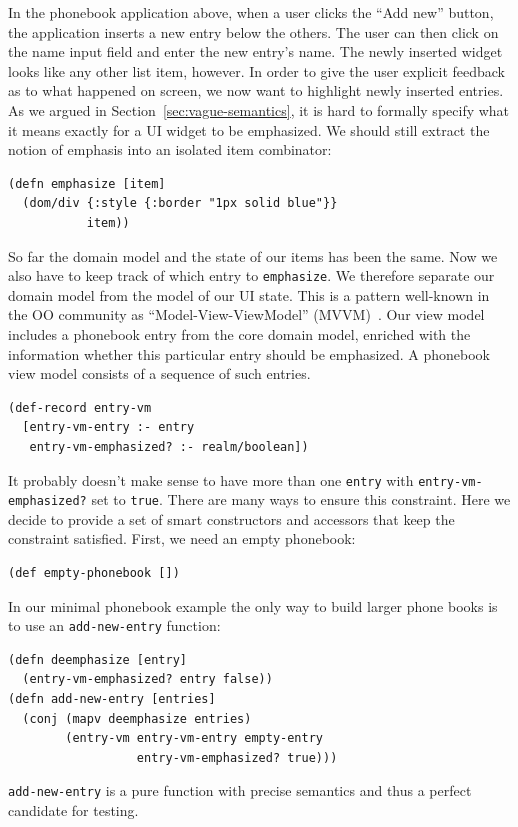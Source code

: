 \documentclass[sigplan,screen]{acmart}
\begin{document}
In the phonebook application above, when a user clicks the ``Add
new'' button, the application inserts a new entry below the others. The user can
then click on the name input field and enter the new entry's name. The
newly inserted widget looks like any other list item, however. In
order to give the user explicit feedback as to what happened on
screen, we now want to highlight newly inserted entries. As we argued
in Section~\ref{sec:vague-semantics}, it is hard to formally specify what it means exactly for a UI
widget to be emphasized. We should still extract the notion of
emphasis into an isolated item combinator:
%
\begin{verbatim}
(defn emphasize [item]
  (dom/div {:style {:border "1px solid blue"}}
           item))
\end{verbatim}
%
So far the domain model and the state of our items has been the same. Now
we also have to keep track of which entry to \texttt{emphasize}. We
therefore separate our domain model from the model of our UI state. This
is a pattern well-known in the OO community
as ``Model-View-ViewModel'' (MVVM)~\cite{MVVM}.
Our view model includes a phonebook entry from the core domain model,
enriched with the information whether this particular entry should be
emphasized. A phonebook view model consists of a sequence of such
entries.
%
\begin{verbatim}
(def-record entry-vm
  [entry-vm-entry :- entry
   entry-vm-emphasized? :- realm/boolean])
\end{verbatim}
%
It probably doesn't make sense to have more than one \texttt{entry} with
\texttt{entry-vm-emphasized?} set to \texttt{true}. There are many ways to
ensure this constraint. Here we decide to provide a set of smart
constructors and accessors that keep the constraint satisfied. First,
we need an empty phonebook:
%
\begin{verbatim}
(def empty-phonebook [])
\end{verbatim}
%
In our minimal phonebook example the only way to build larger phone
books is to use an \texttt{add-new-entry} function:
%
\begin{verbatim}
(defn deemphasize [entry]
  (entry-vm-emphasized? entry false))
(defn add-new-entry [entries]
  (conj (mapv deemphasize entries)
        (entry-vm entry-vm-entry empty-entry
                  entry-vm-emphasized? true)))
\end{verbatim}
%
\texttt{add-new-entry} is a pure function with precise semantics and
thus a perfect candidate for testing.
\end{document}
